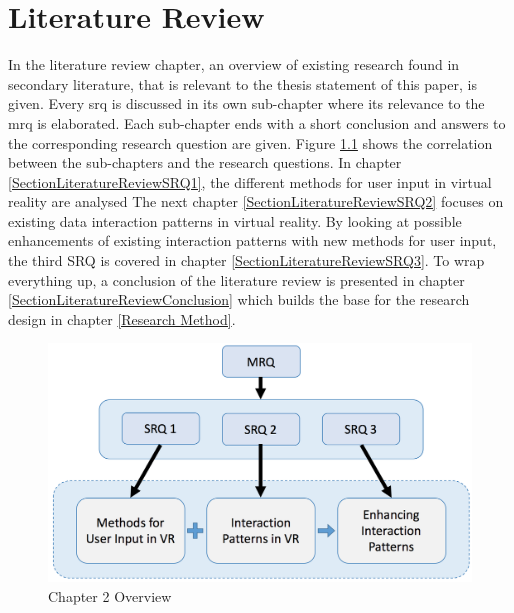 
\chapter{Literature Review} %

\label{ChapterLiteratureReview} %

In the literature review chapter, an overview of existing research found in secondary literature, that is relevant to the thesis statement of this paper, is given. Every \gls{srq} is discussed in its own sub-chapter where its relevance to the \gls{mrq} is elaborated. Each sub-chapter ends with a short conclusion and answers to the corresponding research question are given.
Figure \ref{fig:litreviewoverview} shows the correlation between the sub-chapters and the research questions. In chapter \ref{SectionLiteratureReviewSRQ1}, the different methods for user input in virtual reality are analysed The next chapter \ref{SectionLiteratureReviewSRQ2} focuses on existing data interaction patterns in virtual reality. By looking at possible enhancements of existing interaction patterns with new methods for user input, the third SRQ is covered in chapter \ref{SectionLiteratureReviewSRQ3}. To wrap everything up, a conclusion of the literature review is presented in chapter \ref{SectionLiteratureReviewConclusion} which builds the base for the research design in chapter \ref{Research Method}.
\newline
\begin{figure}[h]
	\begin{center}
		\includegraphics[width=12cm]{03_Figures/05_LitReview/LitReview_SRQ.png}
		\caption[Chapter 2 Overview]{Chapter 2 Overview}
		\label{fig:litreviewoverview}
	\end{center}
\end{figure}


